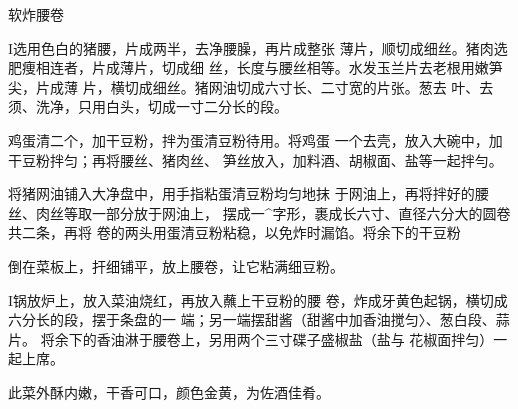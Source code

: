 \begin{recipe}{软炸腰卷}

\ingredients



\cooking

I选用色白的猪腰，片成两半，去净腰臊，再片成整张 薄片，顺切成细丝。猪肉选肥痩相连者，片成薄片，切成细 丝，长度与腰丝相等。水发玉兰片去老根用嫩笋尖，片成薄 片，横切成细丝。猪网油切成六寸长、二寸宽的片张。葱去 叶、去须、洗净，只用白头，切成一寸二分长的段。

\step 	鸡蛋清二个，加干豆粉，拌为蛋清豆粉待用。将鸡蛋 一个去壳，放入大碗中，加干豆粉拌匀；再将腰丝、猪肉丝、 笋丝放入，加料酒、胡椒面、盐等一起拌勻。

\step 	将猪网油铺入大净盘中，用手指粘蛋清豆粉均匀地抹 于网油上，再将拌好的腰丝、肉丝等取一部分放于网油上， 摆成一^字形，裹成长六寸、直径六分大的圆卷共二条，再将 卷的两头用蛋清豆粉粘稳，以免炸时漏馅。将余下的干豆粉

倒在菜板上，扞细铺平，放上腰卷，让它粘满细豆粉。

I锅放炉上，放入菜油烧红，再放入蘸上干豆粉的腰 卷，炸成牙黄色起锅，横切成六分长的段，摆于条盘的一 端；另一端摆甜酱（甜酱中加香油搅匀〉、葱白段、蒜片。 将余下的香油淋于腰卷上，另用两个三寸碟子盛椒盐（盐与 花椒面拌匀）一起上席。

\notes

此菜外酥内嫩，干香可口，颜色金黄，为佐酒佳肴。

\end{recipe}

